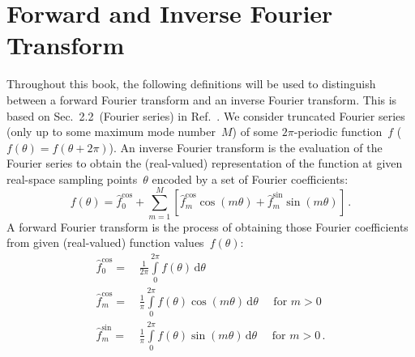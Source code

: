 \FloatBarrier
\section{Forward and Inverse Fourier Transform}
Throughout this book, the following definitions will be used to distinguish
between a forward Fourier transform and an inverse Fourier transform.
This is based on Sec.~2.2~(Fourier series) in Ref.~\cite{boyd_spectral_methods}.
We consider truncated Fourier series (only up to some maximum mode number~$M$)
of some $2 \pi$-periodic function~$f$ ($f(\theta) = f(\theta + 2 \pi)$).
An inverse Fourier transform is the evaluation of the Fourier series
to obtain the (real-valued) representation of the function
at given real-space sampling points~$\theta$
encoded by a set of Fourier coefficients:
\begin{equation}
  f(\theta) = \hat{f}_0^\mathrm{cos} + \sum_{m=1}^{M} \left[ \hat{f}_m^\mathrm{cos} \cos(m \theta) + \hat{f}_m^\mathrm{sin} \sin(m \theta) \right] \, .
\end{equation}
A forward Fourier transform is the process of obtaining those Fourier coefficients
from given (real-valued) function values~$f(\theta)$:
\begin{align}
  \hat{f}_0^\mathrm{cos} =&\, \frac{1}{2 \pi} \int\limits_{0}^{2 \pi} f(\theta)                \,\mathrm{d}\theta                            \nonumber \\
  \hat{f}_m^\mathrm{cos} =&\, \frac{1}{  \pi} \int\limits_{0}^{2 \pi} f(\theta) \cos(m \theta) \,\mathrm{d}\theta \quad \textrm{ for } m > 0 \label{eqn:fc_def} \\
  \hat{f}_m^\mathrm{sin} =&\, \frac{1}{  \pi} \int\limits_{0}^{2 \pi} f(\theta) \sin(m \theta) \,\mathrm{d}\theta \quad \textrm{ for } m > 0 \nonumber \, .
\end{align}

\FloatBarrier
